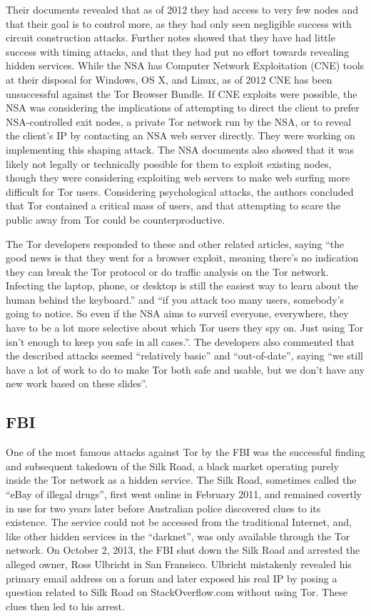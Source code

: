 \documentclass[journal]{IEEEtran}
\begin{document}
Their documents revealed that as of 2012 they had access to very few nodes and that their goal is to control more, as they had only seen negligible success with circuit construction attacks. Further notes showed that they have had little success with timing attacks, and that they had put no effort towards revealing hidden services. While the NSA has Computer Network Exploitation (CNE) tools at their disposal for Windows, OS X, and Linux, as of 2012 CNE has been unsuccessful against the Tor Browser Bundle. If CNE exploits were possible, the NSA was considering the implications of attempting to direct the client to prefer NSA-controlled exit nodes, a private Tor network run by the NSA, or to reveal the client's IP by contacting an NSA web server directly. They were working on implementing this shaping attack. The NSA documents also showed that it was likely not legally or technically possible for them to exploit existing nodes, though they were considering exploiting web servers to make web surfing more difficult for Tor users. Considering psychological attacks, the authors concluded that Tor contained a critical mass of users, and that attempting to scare the public away from Tor could be counterproductive.\cite{GuardianTorStinks}

The Tor developers responded to these and other related articles, saying ``the good news is that they went for a browser exploit, meaning there's no indication they can break the Tor protocol or do traffic analysis on the Tor network. Infecting the laptop, phone, or desktop is still the easiest way to learn about the human behind the keyboard.'' and ``if you attack too many users, somebody's going to notice. So even if the NSA aims to surveil everyone, everywhere, they have to be a lot more selective about which Tor users they spy on. Just using Tor isn't enough to keep you safe in all cases.''. The developers also commented that the described attacks seemed ``relatively basic'' and ``out-of-date'', saying ``we still have a lot of work to do to make Tor both safe and usable, but we don't have any new work based on these slides''.\cite{TorBlogGuardian}

\subsection{FBI}

One of the most famous attacks against Tor by the FBI was the successful finding and subsequent takedown of the Silk Road, a black market operating purely inside the Tor network as a hidden service. The Silk Road, sometimes called the ``eBay of illegal drugs'', first went online in February 2011, and remained covertly in use for two years later before Australian police discovered clues to its existence. The service could not be accessed from the traditional Internet, and, like other hidden services in the ``darknet'', was only available through the Tor network. On October 2, 2013, the FBI shut down the Silk Road and arrested the alleged owner, Ross Ulbricht in San Fransisco. Ulbricht mistakenly revealed his primary email address on a forum and later exposed his real IP by posing a question related to Silk Road on StackOverflow.com without using Tor. These clues then led to his arrest.
\end{document}
